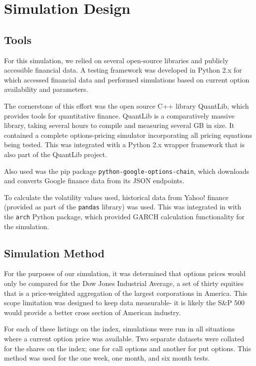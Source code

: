 \chapter{Simulation Design}
\section{Tools}

For this simulation, we relied on several open-source libraries and publicly accessible financial data. A testing framework was developed in Python 2.x for which accessed financial data and performed simulations based on current option availability and parameters. 

The cornerstone of this effort was the open source C++ library QuantLib, which provides tools for quantitative finance. QuantLib is a comparatively massive library, taking several hours to compile and measuring several GB in size. It contained a complete options-pricing simulator incorporating all pricing equations being tested. This was integrated with a Python 2.x wrapper framework that is also part of the QuantLib project.

Also used was the pip package \verb|python-google-options-chain|, which downloads and converts Google finance data from its JSON endpoints. 

To calculate the volatility values used, historical data from Yahoo! finance (provided as part of the \verb|pandas| library) was used. This was integrated in with the \verb|arch| Python package, which provided GARCH calculation functionality for the simulation.

\section{Simulation Method}
For the purposes of our simulation, it was determined that options prices would only be compared for the Dow Jones Industrial Average, a set of thirty equities that is a price-weighted aggregation of the largest corporations in America. This scope limitation was designed to keep data measurable- it is likely the S\&P 500 would provide a better cross section of American industry. 

For each of these listings on the index, simulations were run in all situations where a current option price was available. Two separate datasets were collated for the shares on the index; one for call options and another for put options. This method was used for the one week, one month, and six month tests.

